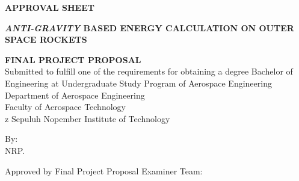 \begin{center}
	\large
  \textbf{APPROVAL SHEET}
\end{center}

\thispagestyle{empty}

\begin{center}
  \textbf{\emph{ANTI-GRAVITY} BASED ENERGY CALCULATION ON OUTER SPACE ROCKETS}
\end{center}

\begingroup
  \small

  \begin{center}
    \textbf{FINAL PROJECT PROPOSAL} \\
    Submitted to fulfill one of the requirements for obtaining a degree
    Bachelor of Engineering at 
    Undergraduate Study Program of Aerospace Engineering \\
    Department of Aerospace Engineering \\
    Faculty of Aerospace Technology \\z
    Sepuluh Nopember Institute of Technology
  \end{center}

  \begin{center}
    By: \textbf{\name} \\
    NRP. \nrp
  \end{center}

  \begin{center}
    Approved by Final Project Proposal Examiner Team:
  \end{center}

  \begingroup
    \setlength{\tabcolsep}{0pt}

